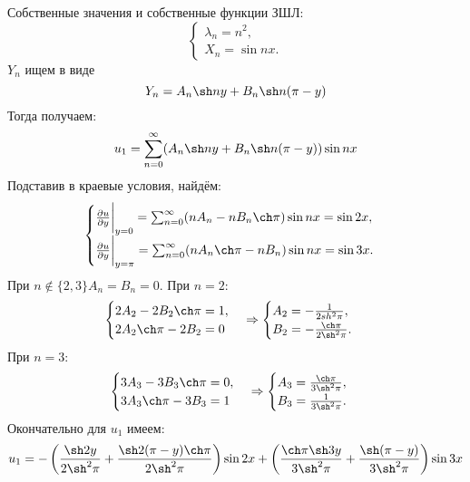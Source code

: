 \documentclass[11pt]{article}
\begin{document}
Собственные значения и собственные функции ЗШЛ:
\begin{equation*}
\begin{cases}
\lambda_n = n^2, \\
X_n = \sin nx.
\end{cases}
\end{equation*}
$Y_n$ ищем в виде
\begin{equation*}
Y_n = A_n\sh ny + B_n\sh n(\pi - y)
\end{equation*}
Тогда получаем:
\begin{equation*}
u_1 = \sum_{n = 0}^{\infty}(A_n\sh ny + B_n\sh n(\pi - y))\sin nx
\end{equation*}
Подставив в краевые условия, найдём:
\begin{equation*}
\begin{cases}
\frac{\partial u}{\partial y}\bigg|_{y = 0} = \sum_{n = 0}^{\infty}(nA_n - nB_n\ch\pi)\sin nx = \sin 2x, \\
\frac{\partial u}{\partial y}\bigg|_{y = \pi} = \sum_{n = 0}^{\infty}(nA_n\ch\pi - nB_n)\sin nx = \sin 3x.
\end{cases}
\end{equation*}
При $n \notin \{2, 3\} A_n = B_n = 0$. При $n = 2$:
\begin{equation*}
\begin{cases}
2A_2 - 2B_2\ch\pi = 1, \\
2A_2\ch\pi - 2B_2 = 0
\end{cases}
\Rightarrow
\begin{cases}
A_2 = -\frac1{2sh^2\pi}, \\
B_2 = -\frac{\ch\pi}{2\sh^2\pi}.
\end{cases}
\end{equation*}
При $n = 3$:
\begin{equation*}
\begin{cases}
3A_3 - 3B_3\ch\pi = 0, \\
3A_3\ch\pi - 3B_3 = 1
\end{cases}
\Rightarrow
\begin{cases}
A_3 = \frac{\ch\pi}{3\sh^2\pi}, \\
B_3 = \frac{1}{3\sh^2\pi}.
\end{cases}
\end{equation*}
Окончательно для $u_1$ имеем:
\begin{equation}
u_1 = -\left(\frac{\sh2y}{2\sh^2\pi} + \frac{\sh2(\pi - y)\ch\pi}{2\sh^2\pi}\right)\sin2x +
\left(\frac{\ch\pi\sh3y}{3\sh^2\pi} + \frac{\sh(\pi - y)}{3\sh^2\pi}\right)\sin3x
\end{equation}
\end{document}
